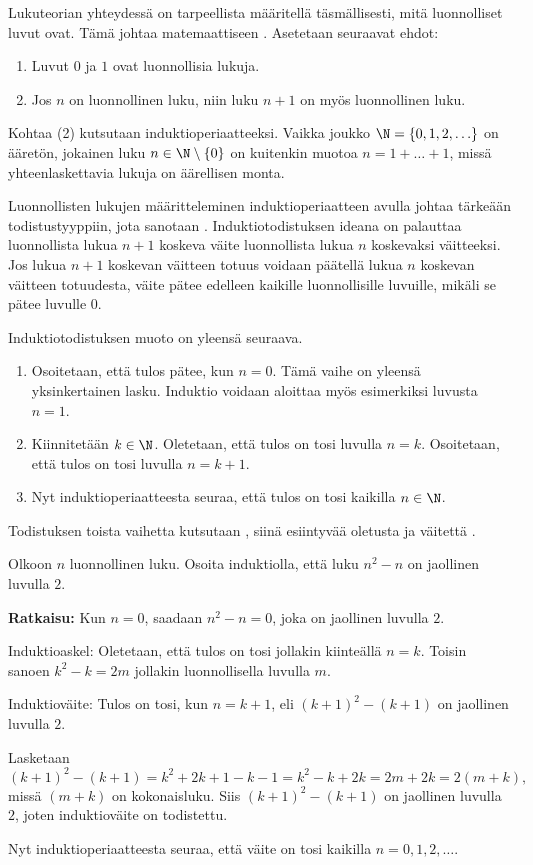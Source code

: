 Lukuteorian yhteydessä on tarpeellista määritellä täsmällisesti, mitä luonnolliset luvut ovat. Tämä johtaa matemaattiseen . Asetetaan seuraavat ehdot:
\begin{enumerate}
\item Luvut $0$ ja $1$ ovat luonnollisia lukuja.
\item Jos $n$ on luonnollinen luku, niin luku $n+1$ on myös luonnollinen luku.
\end{enumerate}
Kohtaa (2) kutsutaan induktioperiaatteeksi. Vaikka joukko
$\N = \{0, 1, 2, \ldots\}$
on ääretön, jokainen luku $n\in \N\setminus \{0\}$ on kuitenkin muotoa $n=1+\ldots + 1$, missä yhteenlaskettavia lukuja on äärellisen monta.

Luonnollisten lukujen määritteleminen induktioperiaatteen avulla johtaa tärkeään todistustyyppiin, jota sanotaan . Induktiotodistuksen ideana on palauttaa luonnollista lukua $n+1$ koskeva väite luonnollista lukua $n$ koskevaksi väitteeksi. Jos lukua $n+1$ koskevan väitteen totuus voidaan päätellä lukua $n$ koskevan väitteen totuudesta, väite pätee  edelleen kaikille luonnollisille luvuille, mikäli se pätee luvulle $0$. 

\newpage
Induktiotodistuksen muoto on yleensä seuraava.
\begin{enumerate}
\item Osoitetaan, että tulos pätee, kun $n=0$. Tämä vaihe on yleensä yksinkertainen lasku. Induktio voidaan aloittaa myös esimerkiksi luvusta $n=1$.
\item Kiinnitetään $k\in \N$. Oletetaan, että tulos on tosi luvulla $n=k$. Osoitetaan, että tulos on tosi luvulla $n=k+1$.
\item Nyt induktioperiaatteesta seuraa, että tulos on tosi kaikilla $n\in \N$.
\end{enumerate}
Todistuksen toista vaihetta kutsutaan , siinä esiintyvää oletusta  ja väitettä .

\begin{esimerkki}
Olkoon $n$ luonnollinen luku. Osoita induktiolla, että luku $n^2-n$ on jaollinen luvulla $2$.

{\bf Ratkaisu:} 
Kun $n=0$, saadaan $n^2-n=0$, joka on jaollinen luvulla $2$.

Induktioaskel: Oletetaan, että tulos on tosi jollakin kiinteällä $n=k$. Toisin sanoen $k^2-k=2m$ jollakin luonnollisella luvulla $m$. 

Induktioväite: Tulos on tosi, kun $n=k+1$, eli $(k+1)^2-(k+1)$ on jaollinen luvulla $2$.

Lasketaan
\[
(k+1)^2-(k+1)= k^2+2k+1-k-1= k^2-k +2k=2m +2k =2(m+k),
\]
missä $(m+k)$ on kokonaisluku. Siis $(k+1)^2-(k+1)$ on jaollinen luvulla $2$, joten induktioväite on todistettu.

Nyt induktioperiaatteesta seuraa, että väite on tosi kaikilla $n=0, 1, 2, \ldots$.
\end{esimerkki}

